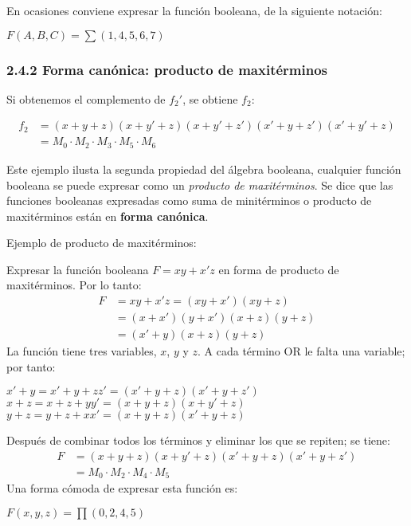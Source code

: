 En ocasiones conviene expresar la funci\'{o}n booleana, de la siguiente
notaci\'{o}n: \begin{center} $F(A, B, C) = \sum(1, 4, 5, 6, 7)$ \end{center}

\subsubsection*{2.4.2 Forma can\'{o}nica: producto de maxit\'{e}rminos}
\begin{flushleft} Si obtenemos el complemento de $f_2'$, se obtiene $f_2$:
\end{flushleft} \begin{align*} f_2 & = (x + y + z)(x + y' + z)(x + y' + z')(x' +
               y + z')(x' + y' + z)                              \\ &= M_0 \cdot M_2 \cdot M_3 \cdot M_5 \cdot M_6
\end{align*}

Este ejemplo ilusta la segunda propiedad del \'{a}lgebra booleana, cualquier
funci\'{o}n booleana se puede expresar como un \textit{producto de
maxit\'{e}rminos}. Se dice que las funciones booleanas expresadas como suma de
minit\'{e}rminos o producto de maxit\'{e}rminos est\'{a}n en \textbf{forma
can\'{o}nica}. \medbreak

Ejemplo de producto de maxit\'{e}rminos: \begin{flushleft} Expresar la
    funci\'{o}n booleana $F = xy + x'z$ en forma de producto de maxit\'{e}rminos.
    Por lo tanto: \begin{align*} F & = xy + x'z = (xy + x')(xy + z) \\ &= (x + x')(y
               + x')(x + z)(y + z)                \\ &= (x' + y)(x + z)(y + z)\end{align*} La funci\'{o}n
    tiene tres variables, $x$, $y$ y $z$. A cada t\'{e}rmino OR le falta una
    variable; por tanto: \begin{center} $x' + y = x' + y + zz' = (x' + y + z)(x' + y
            + z')$ \\ $x + z = x + z + yy' = (x + y + z)(x + y' + z)$ \\ $y + z = y + z +
            xx' = (x + y + z)(x' + y + z)$ \end{center} Despu\'{e}s de combinar todos los
    t\'{e}rminos y eliminar los que se repiten; se tiene: \begin{align*} F & = (x + y
               + z)(x + y' + z)(x' + y + z)(x' + y + z') \\ &= M_0 \cdot M_2 \cdot M_4 \cdot
               M_5\end{align*} Una forma c\'{o}moda de expresar esta funci\'{o}n es:
    \begin{center} $F(x, y, z) = \prod(0, 2, 4, 5)$ \end{center} \end{flushleft}

